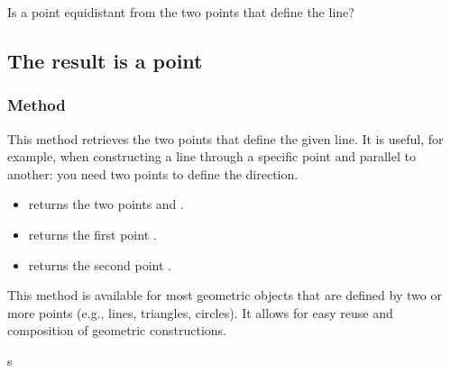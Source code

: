 Is a point equidistant from the two points that define the line?

\begin{tkzexample}[latex=.5\textwidth]
\begin{center}
\end{center}
\end{tkzexample}

\subsection{The result is a point}



\subsubsection{Method }
\label{ssub:method_line_get}

This method retrieves the two points that define the given line. It is useful, for example, when constructing a line through a specific point and parallel to another: you need two points to define the direction.

\begin{itemize}
  \item {} returns the two points  and .
  \item {} returns the first point .
  \item {} returns the second point .
\end{itemize}

This method is available for most geometric objects that are defined by two or more points (e.g., lines, triangles, circles). It allows for easy reuse and composition of geometric constructions.


\begin{tkzexample}[latex=.35\textwidth]

\end{tkzexample}
s

